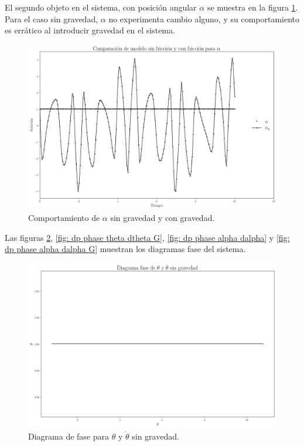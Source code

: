 \documentclass[12pt,letterpaper]{article}
\begin{document}
\pagebreak



El segundo objeto en el sistema, con posición angular $\alpha$ se muestra en la figura \ref{fig: dp alpha alphaG}.
Para el caso sin gravedad, $\alpha$ no experimenta cambio alguno, y su comportamiento es errático al introducir
gravedad en el sistema.

\begin{figure}[h]
 \centering
 \includegraphics[scale=0.2]{img/dp_alpha_alphaG.png}
 \caption{Comportamiento de $\alpha$ sin gravedad y con gravedad.}
 \label{fig: dp alpha alphaG}
\end{figure}

\pagebreak

Las figuras \ref{fig: dp phase theta dtheta}, \ref{fig: dp phase theta dtheta G}, \ref{fig: dp phase alpha dalpha} y \ref{fig: dp phase alpha dalpha G} muestran los diagramas fase del sistema.

\begin{figure}[h]
 \centering
 \includegraphics[scale=0.2]{img/dp_phase_theta_dtheta.png}
 \caption{Diagrama de fase para $\theta$ y $\dot{\theta}$ sin gravedad.}
 \label{fig: dp phase theta dtheta}
\end{figure}
\end{document}
